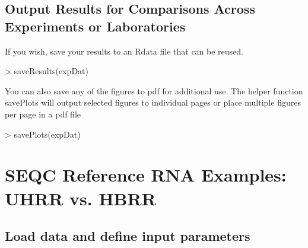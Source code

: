 \documentclass{article}
\begin{document}
\subsection{Output Results for Comparisons Across Experiments or Laboratories}
If you wish, save your results to an Rdata file that can be reused.
\begin{Schunk}
\begin{Sinput}
> saveResults(expDat)
\end{Sinput}
\end{Schunk}
You can also save any of the figures to pdf for additional use. The helper function
savePlots will output selected figures to individual pages or place multiple
figures per page in a pdf file
\begin{Schunk}
\begin{Sinput}
> savePlots(expDat)
\end{Sinput}
\end{Schunk}

\section{SEQC Reference RNA Examples: UHRR vs. HBRR}
\subsection{Load data and define input parameters}
\end{document}
